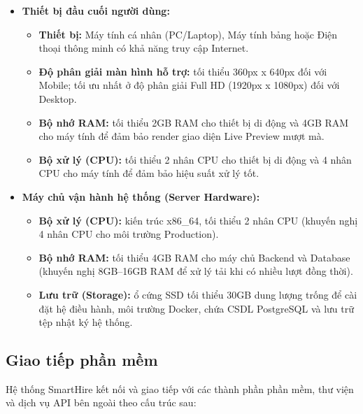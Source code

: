 \begin{itemize}
    \item \textbf{Thiết bị đầu cuối người dùng:}
    \begin{itemize}
        \item \textbf{Thiết bị:} Máy tính cá nhân (PC/Laptop), Máy tính bảng hoặc Điện thoại thông minh có khả năng truy cập Internet.
        \item \textbf{Độ phân giải màn hình hỗ trợ:} tối thiểu 360px x 640px đối với Mobile; tối ưu nhất ở độ phân giải Full HD (1920px x 1080px) đối với Desktop.
        \item \textbf{Bộ nhớ RAM:} tối thiểu 2GB RAM cho thiết bị di động và 4GB RAM cho máy tính để đảm bảo render giao diện Live Preview mượt mà.
        \item \textbf{Bộ xử lý (CPU):} tối thiểu 2 nhân CPU cho thiết bị di động và 4 nhân CPU cho máy tính để đảm bảo hiệu suất xử lý tốt.
    \end{itemize}

    \item \textbf{Máy chủ vận hành hệ thống (Server Hardware):}
    \begin{itemize}
        \item \textbf{Bộ xử lý (CPU):} kiến trúc x86\_64, tối thiểu 2 nhân CPU (khuyến nghị 4 nhân CPU cho môi trường Production).
        \item \textbf{Bộ nhớ RAM:} tối thiểu 4GB RAM cho máy chủ Backend và Database (khuyến nghị 8GB--16GB RAM để xử lý tải khi có nhiều lượt đồng thời).
        \item \textbf{Lưu trữ (Storage):} ổ cứng SSD tối thiểu 30GB dung lượng trống để cài đặt hệ điều hành, môi trường Docker, chứa CSDL PostgreSQL và lưu trữ tệp nhật ký hệ thống.
    \end{itemize}
\end{itemize}

\subsection{Giao tiếp phần mềm}

Hệ thống SmartHire kết nối và giao tiếp với các thành phần phần mềm, thư viện và dịch vụ API bên ngoài theo cấu trúc sau:

